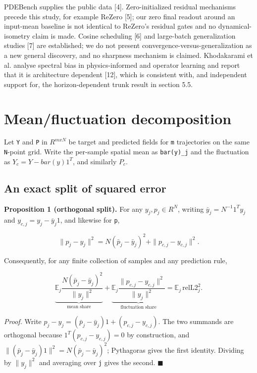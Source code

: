 \documentclass[preprint,12pt]{elsarticle}
\begin{document}
PDEBench supplies the public data [4]. Zero-initialized residual mechanisms precede this study, for example ReZero [5]; our zero final readout around an input-mean baseline is not identical to ReZero's residual gates and no dynamical-isometry claim is made. Cosine scheduling [6] and large-batch generalization studies [7] are established; we do not present convergence-versus-generalization as a new general discovery, and no sharpness mechanism is claimed. Khodakarami et al. analyse spectral bias in physics-informed and operator learning and report that it is architecture dependent [12], which is consistent with, and independent support for, the horizon-dependent trunk result in section 5.5.

\section{Mean/fluctuation decomposition}

Let \texttt{Y} and \texttt{P} in $R^{m x N}$ be target and predicted fields for \texttt{m} trajectories on the same \texttt{N}-point grid. Write the per-sample spatial mean as \texttt{bar(y)\_j} and the fluctuation as $Y_c = Y - bar(y) 1^T$, and similarly $P_c$.

\subsection{An exact split of squared error}

\textbf{Proposition 1 (orthogonal split).} For any $y_j, p_j \in R^N$, writing $\bar y_j = N^{-1} 1^T y_j$ and $y_{c,j} = y_j - \bar y_j 1$, and likewise for \texttt{p},

\[
  \|p_j - y_j\|^2 = N(\bar p_j - \bar y_j)^2 + \|p_{c,j} - y_{c,j}\|^2 .
\]

Consequently, for any finite collection of samples and any prediction rule,

\[
  \underbrace{\mathbb{E}_j \frac{N(\bar p_j-\bar y_j)^2}{\|y_j\|^2}}_{\text{mean share}}
  +
  \underbrace{\mathbb{E}_j \frac{\|p_{c,j}-y_{c,j}\|^2}{\|y_j\|^2}}_{\text{fluctuation share}}
  = \mathbb{E}_j\,\mathrm{relL2}_j^2 .
\]

\emph{Proof.} Write $p_j - y_j = (\bar p_j - \bar y_j)1 + (p_{c,j} - y_{c,j})$. The two summands are orthogonal because $1^T (p_{c,j} - y_{c,j}) = 0$ by construction, and $\|(\bar p_j - \bar y_j)1\|^2 = N(\bar p_j - \bar y_j)^2$; Pythagoras gives the first identity. Dividing by $\|y_j\|^2$ and averaging over \texttt{j} gives the second. $\blacksquare$
\end{document}
